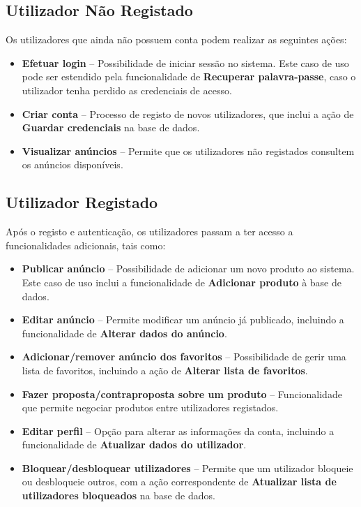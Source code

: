 \documentclass[a4paper, 12pt]{article} %
\begin{document}
\subsection{Utilizador Não Registado}
Os utilizadores que ainda não possuem conta podem realizar as seguintes ações:
\begin{itemize}
	\item \textbf{Efetuar login} – Possibilidade de iniciar sessão no sistema. Este caso de uso pode ser estendido pela funcionalidade de \textbf{Recuperar palavra-passe}, caso o utilizador tenha perdido as credenciais de acesso.
	\item \textbf{Criar conta} – Processo de registo de novos utilizadores, que inclui a ação de \textbf{Guardar credenciais} na base de dados.
	\item \textbf{Visualizar anúncios} – Permite que os utilizadores não registados consultem os anúncios disponíveis.
\end{itemize}

\subsection{Utilizador Registado}
Após o registo e autenticação, os utilizadores passam a ter acesso a funcionalidades adicionais, tais como:
\begin{itemize}
	\item \textbf{Publicar anúncio} – Possibilidade de adicionar um novo produto ao sistema. Este caso de uso inclui a funcionalidade de \textbf{Adicionar produto} à base de dados.
	\item \textbf{Editar anúncio} – Permite modificar um anúncio já publicado, incluindo a funcionalidade de \textbf{Alterar dados do anúncio}.
	\item \textbf{Adicionar/remover anúncio dos favoritos} – Possibilidade de gerir uma lista de favoritos, incluindo a ação de \textbf{Alterar lista de favoritos}.
	\item \textbf{Fazer proposta/contraproposta sobre um produto} – Funcionalidade que permite negociar produtos entre utilizadores registados.
	\item \textbf{Editar perfil} – Opção para alterar as informações da conta, incluindo a funcionalidade de \textbf{Atualizar dados do utilizador}.
	\item \textbf{Bloquear/desbloquear utilizadores} – Permite que um utilizador bloqueie ou desbloqueie outros, com a ação correspondente de \textbf{Atualizar lista de utilizadores bloqueados} na base de dados.
\end{itemize}
\end{document}
